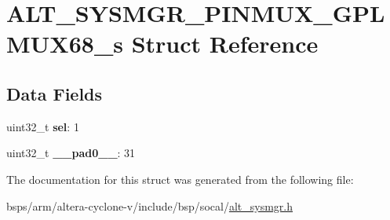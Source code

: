 \hypertarget{structALT__SYSMGR__PINMUX__GPLMUX68__s}{}\section{A\+L\+T\+\_\+\+S\+Y\+S\+M\+G\+R\+\_\+\+P\+I\+N\+M\+U\+X\+\_\+\+G\+P\+L\+M\+U\+X68\+\_\+s Struct Reference}
\label{structALT__SYSMGR__PINMUX__GPLMUX68__s}
\subsection*{Data Fields}
\begin{DoxyCompactItemize}
\item 
\mbox{\label{structALT__SYSMGR__PINMUX__GPLMUX68__s_a0cbf988fc02328d507a8e12ea55b2257}} 
uint32\+\_\+t {\bfseries sel}\+: 1
\item 
\mbox{\label{structALT__SYSMGR__PINMUX__GPLMUX68__s_a8c214a6cd6055bb80b185c3a3092fffa}} 
uint32\+\_\+t {\bfseries \+\_\+\+\_\+pad0\+\_\+\+\_\+}\+: 31
\end{DoxyCompactItemize}


The documentation for this struct was generated from the following file\+:\begin{DoxyCompactItemize}
\item 
bsps/arm/altera-\/cyclone-\/v/include/bsp/socal/\mbox{\hyperlink{alt__sysmgr_8h}{alt\+\_\+sysmgr.\+h}}\end{DoxyCompactItemize}
